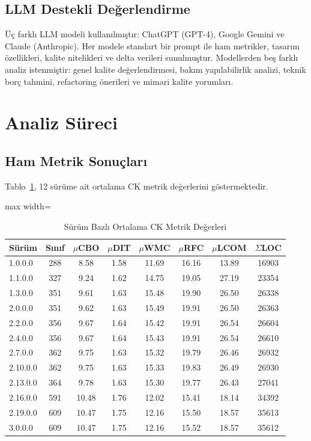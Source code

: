 \documentclass[conference]{IEEEtran}
\begin{document}
\subsection{LLM Destekli De\u{g}erlendirme}
\"U\c{c} farkl{\i} LLM modeli kullan{\i}lm{\i}\c{s}t{\i}r: ChatGPT (GPT-4), Google Gemini ve Claude (Anthropic). Her modele standart bir prompt ile ham metrikler, tasar{\i}m \"ozellikleri, kalite nitelikleri ve delta verileri sunulmu\c{s}tur. Modellerden be\c{s} farkl{\i} analiz istenmi\c{s}tir: genel kalite de\u{g}erlendirmesi, bak{\i}m yap{\i}labilirlik analizi, teknik bor\c{c} tahmini, refactoring \"onerileri ve mimari kalite yorumlar{\i}.

\section{Analiz S\"ureci}

\subsection{Ham Metrik Sonu\c{c}lar{\i}}
Tablo~\ref{tab:rawmetrics}, 12 s\"ur\"ume ait ortalama CK metrik de\u{g}erlerini g\"ostermektedir.

\begin{table}[htbp]
\caption{S\"ur\"um Bazl{\i} Ortalama CK Metrik De\u{g}erleri}
\label{tab:rawmetrics}
\centering
\begin{adjustbox}{max width=\columnwidth}
\begin{tabular}{lccccccc}
\toprule
S\"ur\"um & S{\i}n{\i}f & $\mu$CBO & $\mu$DIT & $\mu$WMC & $\mu$RFC & $\mu$LCOM & $\Sigma$LOC \\
\midrule
1.0.0.0 & 288 & 8.58 & 1.58 & 11.69 & 16.16 & 13.89 & 16903 \\
1.1.0.0 & 327 & 9.24 & 1.62 & 14.75 & 19.05 & 27.19 & 23354 \\
1.3.0.0 & 351 & 9.61 & 1.63 & 15.48 & 19.90 & 26.50 & 26338 \\
2.0.0.0 & 351 & 9.62 & 1.63 & 15.49 & 19.91 & 26.50 & 26363 \\
2.2.0.0 & 356 & 9.67 & 1.64 & 15.42 & 19.91 & 26.54 & 26604 \\
2.4.0.0 & 356 & 9.67 & 1.64 & 15.43 & 19.91 & 26.54 & 26610 \\
2.7.0.0 & 362 & 9.75 & 1.63 & 15.32 & 19.79 & 26.46 & 26932 \\
2.10.0.0 & 362 & 9.75 & 1.63 & 15.33 & 19.83 & 26.49 & 26930 \\
2.13.0.0 & 364 & 9.78 & 1.63 & 15.30 & 19.77 & 26.43 & 27041 \\
2.16.0.0 & 591 & 10.48 & 1.76 & 12.02 & 15.41 & 18.14 & 34392 \\
2.19.0.0 & 609 & 10.47 & 1.75 & 12.16 & 15.50 & 18.57 & 35613 \\
3.0.0.0 & 609 & 10.47 & 1.75 & 12.16 & 15.52 & 18.57 & 35612 \\
\bottomrule
\end{tabular}
\end{adjustbox}
\end{table}
\end{document}
